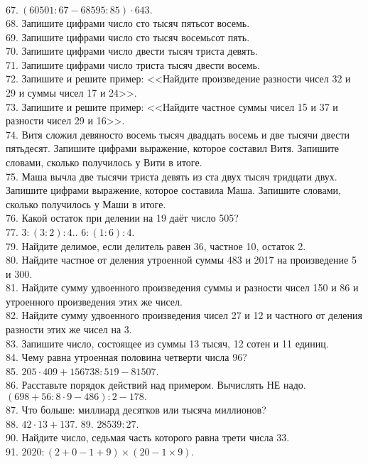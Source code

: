 $67.\ (60501:67-68595:85)\cdot643.$\\
68. Запишите цифрами число сто тысяч пятьсот восемь.\\
69. Запишите цифрами число сто тысяч восемьсот пять.\\
70. Запишите цифрами число двести тысяч триста девять.\\
71. Запишите цифрами число триста тысяч двести восемь.\\
72. Запишите и решите пример: <<Найдите произведение разности чисел 32 и 29 и суммы чисел 17 и 24>>.\\
73. Запишите и решите пример: <<Найдите частное суммы чисел 15 и 37 и разности чисел 29 и 16>>.\\
74. Витя сложил девяносто восемь тысяч двадцать восемь и две тысячи двести пятьдесят. Запишите цифрами выражение, которое составил Витя. Запишите словами, сколько получилось у Вити в итоге.\\
75. Маша вычла две тысячи триста девять из ста двух тысяч тридцати двух. Запишите цифрами выражение, которое составила Маша. Запишите словами, сколько получилось у Маши в итоге.\\
76. Какой остаток при делении на 19 даёт число 505?\\
77. $3:(3:2):4.$\qquad  {}. $6:(1:6):4.$\\
79. Найдите делимое, если делитель равен 36, частное 10, остаток 2.\\
80. Найдите частное от деления утроенной суммы 483 и 2017 на произведение 5 и 300.\\
81. Найдите сумму удвоенного произведения суммы и разности чисел 150 и 86 и утроенного произведения этих же чисел.\\
82. Найдите сумму удвоенного произведения чисел 27 и 12 и частного от деления разности этих же чисел на 3.\\
83. Запишите число, состоящее из суммы 13 тысяч, 12 сотен и 11 единиц.\\
84. Чему равна утроенная половина четверти числа 96?\\
85. $205\cdot409+156738:519-81507.$\\
86. Расставьте порядок действий над примером. Вычислять НЕ надо.\\
$(698+56:8\cdot9-486):2-178.$\\
87. Что больше: миллиард десятков или тысяча миллионов?\\
88. $42\cdot13+137.$ 89. $28539:27.$\\ 90. Найдите число, седьмая часть которого равна трети числа 33. \\  91. $2020:(2+0-1+9) \times (20-1 \times 9).$\qquad
